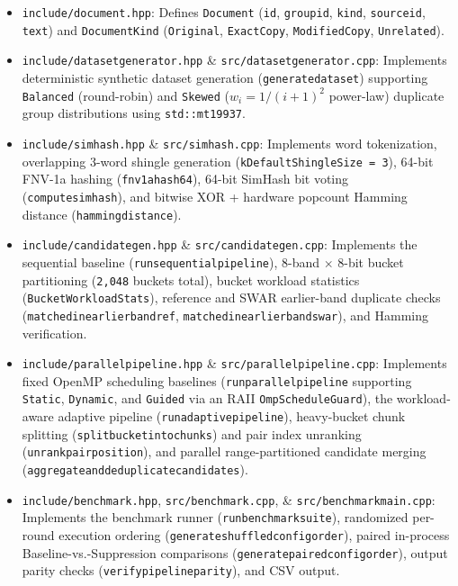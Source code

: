 \documentclass[11pt,a4paper]{article}
\renewcommand{\_}{\textunderscore\allowbreak}
\begin{document}
\begin{itemize}
    \item \texttt{include/document.hpp}: Defines \texttt{Document} (\texttt{id}, \texttt{group\_id}, \texttt{kind}, \texttt{source\_id}, \texttt{text}) and \texttt{DocumentKind} (\texttt{Original}, \texttt{ExactCopy}, \texttt{ModifiedCopy}, \texttt{Unrelated}).
    \item \texttt{include/dataset\_generator.hpp} \& \texttt{src/dataset\_generator.cpp}: Implements deterministic synthetic dataset generation (\texttt{generate\_dataset}) supporting \texttt{Balanced} (round-robin) and \texttt{Skewed} ($w_i = 1/(i+1)^2$ power-law) duplicate group distributions using \texttt{std::mt19937\_64}.
    \item \texttt{include/simhash.hpp} \& \texttt{src/simhash.cpp}: Implements word tokenization, overlapping 3-word shingle generation (\texttt{kDefaultShingleSize = 3}), 64-bit FNV-1a hashing (\texttt{fnv1a\_hash64}), 64-bit SimHash bit voting (\texttt{compute\_simhash}), and bitwise XOR + hardware popcount Hamming distance (\texttt{hamming\_distance}).
    \item \texttt{include/candidate\_gen.hpp} \& \texttt{src/candidate\_gen.cpp}: Implements the sequential baseline (\texttt{run\_sequential\_pipeline}), 8-band $\times$ 8-bit bucket partitioning (\texttt{2,048} buckets total), bucket workload statistics (\texttt{BucketWorkloadStats}), reference and SWAR earlier-band duplicate checks (\texttt{matched\_in\_earlier\_band\_ref}, \texttt{matched\_in\_earlier\_band\_swar}), and Hamming verification.
    \item \texttt{include/parallel\_pipeline.hpp} \& \texttt{src/parallel\_pipeline.cpp}: Implements fixed OpenMP scheduling baselines (\texttt{run\_parallel\_pipeline} supporting \texttt{Static}, \texttt{Dynamic}, and \texttt{Guided} via an RAII \texttt{OmpScheduleGuard}), the workload-aware adaptive pipeline (\texttt{run\_adaptive\_pipeline}), heavy-bucket chunk splitting (\texttt{split\_bucket\_into\_chunks}) and pair index unranking (\texttt{unrank\_pair\_position}), and parallel range-partitioned candidate merging (\texttt{aggregate\_and\_deduplicate\_candidates}).
    \item \texttt{include/benchmark.hpp}, \texttt{src/benchmark.cpp}, \& \texttt{src/benchmark\_main.cpp}: Implements the benchmark runner (\texttt{run\_benchmark\_suite}), randomized per-round execution ordering (\texttt{generate\_shuffled\_config\_order}), paired in-process Baseline-vs.-Suppression comparisons (\texttt{generate\_paired\_config\_order}), output parity checks (\texttt{verify\_pipeline\_parity}), and CSV output.
\end{itemize}
\end{document}
